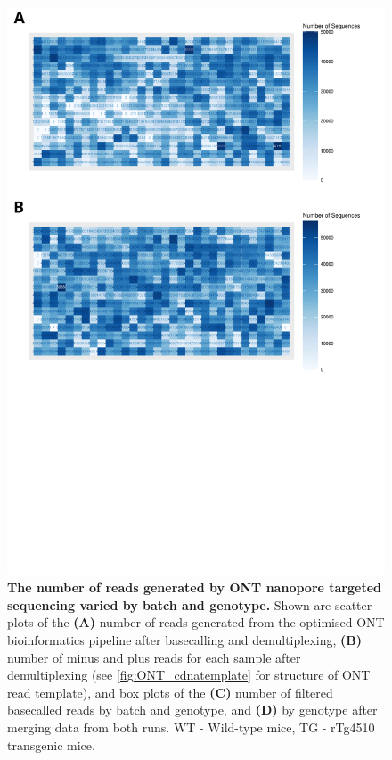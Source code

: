 \begin{figure}[!htp]
	\centering
	\includegraphics[page=4,trim={0 0 0 0},clip,scale = 0.55]{Figures/ONTTargetedTranscriptome.pdf}
	\captionsetup{width=0.95\textwidth}
	\caption[ONT sequencing metrics from targeted profiling of rTg4510 mice]%
	{\textbf{The number of reads generated by ONT nanopore targeted sequencing varied by batch and genotype.} Shown are scatter plots of the \textbf{(A)} number of reads generated from the optimised ONT bioinformatics pipeline after basecalling and demultiplexing, \textbf{(B)} number of minus and plus reads for each sample after demultiplexing (see \cref{fig:ONT_cdnatemplate} for structure of ONT read template), and box plots of the \textbf{(C)} number of filtered basecalled reads by batch and genotype, and \textbf{(D)} by genotype after merging data from both runs. WT - Wild-type mice, TG - rTg4510 transgenic mice.}
	\label{fig:ONT_targeted_run_output}
\end{figure}

